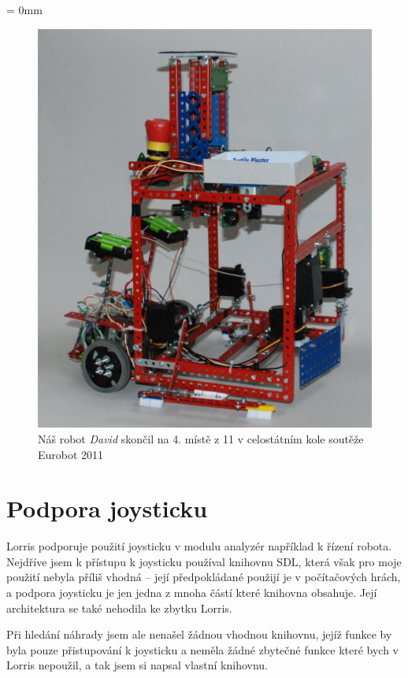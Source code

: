 \documentclass[12pt, a4paper, oneside]{article}
\newcommand{\It}{\textit}  %
\begin{document}
\newpage
\voffset = 0mm
\begin{figure}[H]
\begin{center}
\includegraphics[width=\textwidth]{img/use_david_robot.jpg}
\caption{Náš robot \It{David} skončil na 4. místě z 11 v celostátním kole soutěže Eurobot 2011}
\end{center}
\end{figure}

\section{Podpora joysticku}
Lorris podporuje použití joysticku v modulu analyzér například k řízení robota. Nejdříve jsem k přístupu k joysticku používal knihovnu SDL\cite{sdl}, která však pro moje použití nebyla příliš vhodná -- její předpokládané použijí je v počítačových hrách, a podpora joysticku je jen jedna z mnoha částí které knihovna obsahuje. Její architektura se také nehodila ke zbytku Lorris.

Při hledání náhrady jsem ale nenašel žádnou vhodnou knihovnu, jejíž funkce by byla pouze přistupování k joysticku a neměla žádné zbytečné funkce které bych v Lorris nepoužil, a tak jsem si napsal vlastní knihovnu.
\end{document}
